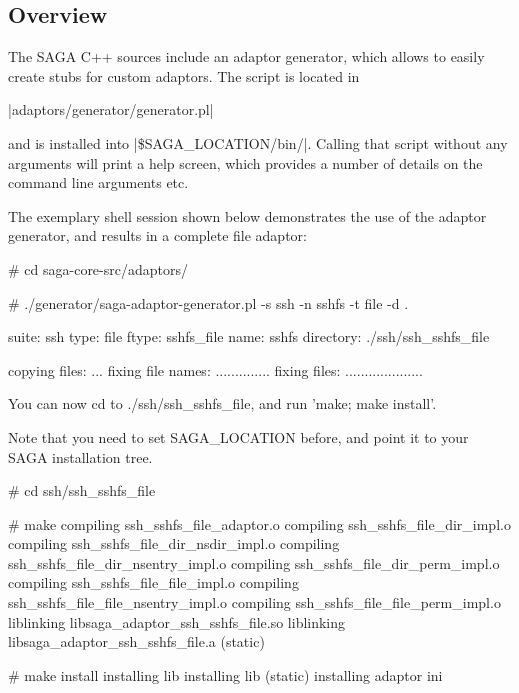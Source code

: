 
\subsection{Overview}

 The SAGA C++ sources include an adaptor generator, which allows to
 easily create stubs for custom adaptors.  The script is located in

 \shift |adaptors/generator/generator.pl|

 and is installed into |\$SAGA_LOCATION/bin/|. Calling that script
 without any arguments will print a help screen, which provides a
 number of details on the command line arguments etc.  
 
 The exemplary
 shell session shown below demonstrates the use of the adaptor
 generator, and results in a complete file adaptor:

 \begin{mycode}
   # cd saga-core-src/adaptors/

   # ./generator/saga-adaptor-generator.pl -s ssh -n sshfs -t file -d .

     suite:             ssh
     type:              file
     ftype:             sshfs_file
     name:              sshfs
     directory:         ./ssh/ssh_sshfs_file

     copying files:     ...
     fixing file names: ..............
     fixing files:      ....................

     You can now cd to ./ssh/ssh_sshfs_file, 
     and run 'make; make install'.  

     Note that you need to set SAGA_LOCATION before,
     and point it to your SAGA installation tree.

   # cd ssh/ssh_sshfs_file

   # make
     compiling    ssh_sshfs_file_adaptor.o
     compiling    ssh_sshfs_file_dir_impl.o
     compiling    ssh_sshfs_file_dir_nsdir_impl.o
     compiling    ssh_sshfs_file_dir_nsentry_impl.o
     compiling    ssh_sshfs_file_dir_perm_impl.o
     compiling    ssh_sshfs_file_file_impl.o
     compiling    ssh_sshfs_file_file_nsentry_impl.o
     compiling    ssh_sshfs_file_file_perm_impl.o
     liblinking   libsaga_adaptor_ssh_sshfs_file.so
     liblinking   libsaga_adaptor_ssh_sshfs_file.a (static)

   # make install
     installing   lib
     installing   lib (static)
     installing   adaptor ini

 \end{mycode}

